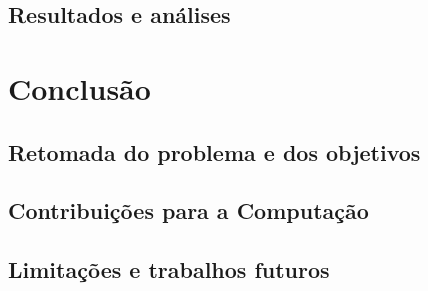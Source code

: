 \documentclass[
    12pt,                %
    openright,           %
    oneside,             %
    a4paper,             %
    english,             %
    brazil               %
]{abntex2}
\begin{document}
\section{Resultados e análises}
\label{sec:resultados}


\chapter{Conclusão}
\label{cap:conclusao}

\section{Retomada do problema e dos objetivos}
\label{sec:retomada}


\section{Contribuições para a Computação}
\label{sec:contribuicoes}


\section{Limitações e trabalhos futuros}
\label{sec:limitacoes_trabalhos_futuros}


%
\end{document}
